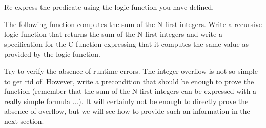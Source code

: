 


Re-express the  predicate using the logic function you
have defined.



\label{l4:acsl-properties-functions-n-first-ints}


The following function computes the sum of the N first integers. Write a
recursive logic function that returns the sum of the N first integers and
write a specification for the C function expressing that it computes the same
value as provided by the logic function.




Try to verify the absence of runtime errors. The integer overflow is not so
simple to get rid of. However, write a precondition that should be enough to
prove the function (remember that the sum of the N first integers can be
expressed with a really simple formula ...). It will certainly not be enough
to directly prove the absence of overflow, but we will see how to provide such
an information in the next section.
